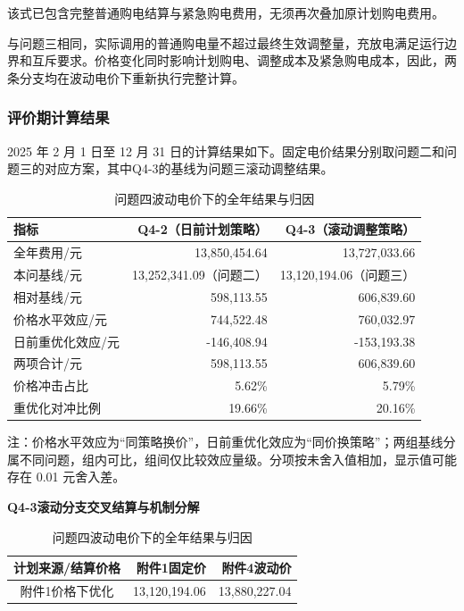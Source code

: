 \documentclass[withoutpreface,bwprint]{cumcmthesis}
\begin{document}
该式已包含完整普通购电结算与紧急购电费用，无须再次叠加原计划购电费用。

与问题三相同，实际调用的普通购电量不超过最终生效调整量，充放电满足运行边界和互斥要求。价格变化同时影响计划购电、调整成本及紧急购电成本，因此，两条分支均在波动电价下重新执行完整计算。

\subsubsection{评价期计算结果}

2025 年 2 月 1 日至 12 月 31
日的计算结果如下。固定电价结果分别取问题二和问题三的对应方案，其中Q4-3的基线为问题三滚动调整结果。

\begin{table}[!htbp]
\centering
\caption{问题四波动电价下的全年结果与归因}
\small
\setlength{\tabcolsep}{4pt}
\begin{tabular}{|l|r|r|}
\hline
指标 & Q4-2（日前计划策略） & Q4-3（滚动调整策略） \\
\hline
全年费用/元 & 13,850,454.64 & 13,727,033.66 \\
\hline
本问基线/元 & 13,252,341.09（问题二） & 13,120,194.06（问题三） \\
\hline
相对基线/元 & 598,113.55 & 606,839.60 \\
\hline
价格水平效应/元 & 744,522.48 & 760,032.97 \\
\hline
日前重优化效应/元 & -146,408.94 & -153,193.38 \\
\hline
两项合计/元 & 598,113.55 & 606,839.60 \\
\hline
价格冲击占比 & 5.62\% & 5.79\% \\
\hline
重优化对冲比例 & 19.66\% & 20.16\% \\
\hline
\end{tabular}
\vspace{2pt}
\begin{flushleft}\footnotesize 注：价格水平效应为“同策略换价”，日前重优化效应为“同价换策略”；两组基线分属不同问题，组内可比，组间仅比较效应量级。分项按未舍入值相加，显示值可能存在 0.01 元舍入差。\end{flushleft}
\par\smallskip
\textbf{Q4-3滚动分支交叉结算与机制分解}\par\smallskip
\begin{tabular}{|c|r|r|}
\hline
计划来源/结算价格 & 附件1固定价 & 附件4波动价 \\
\hline
附件1价格下优化 & 13,120,194.06 & 13,880,227.04 \\

\end{tabular}
\end{table}
\end{document}
